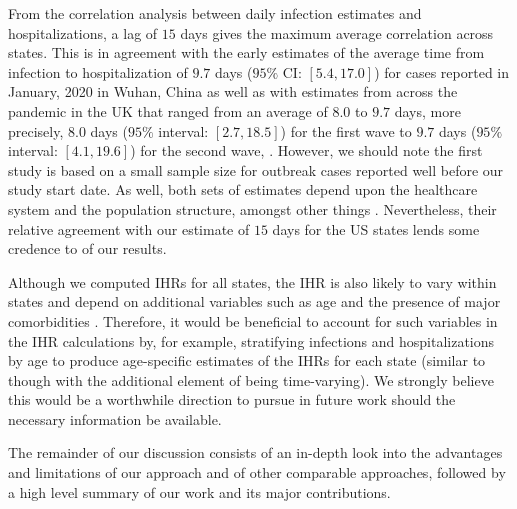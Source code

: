 \documentclass{article}
\begin{document}
From the correlation analysis between daily infection estimates and
hospitalizations, a lag of $15$ days gives the maximum average correlation
across states. This is in agreement with the early estimates of the average time from
 infection to hospitalization of $9.7$ days ($95\%$ CI: $[5.4, 17.0]$) for
cases reported in January, 2020 in Wuhan, China as well as with estimates from
across the pandemic in the UK that ranged from an average of $8.0$ to $9.7$
days, more precisely, $8.0$ days ($95\%$ interval: $[2.7, 18.5]$) for the first
wave to $9.7$ days ($95\%$ interval: $[4.1, 19.6]$) for the second wave,
\citep{ward2021understanding}. However, we should note the first study is based
on a small sample size for outbreak cases reported well before our study start
date. As well, both sets of estimates depend upon the healthcare system and the
population structure, amongst other things \citep{ward2021understanding}.
Nevertheless, their relative agreement with our estimate of $15$ days for the US
states lends some credence to of our results. 

Although we computed IHRs for all states, the IHR is also likely to vary within
states and depend on additional variables such as age and the presence of major
comorbidities \citep{russell2023comorbidities}. Therefore, it would be
beneficial to account for such variables in the IHR calculations by, for
example, stratifying infections and hospitalizations by age to produce
age-specific estimates of the IHRs for each state (similar to
\citealt{fox2023disproportionate} though with the additional element of being
time-varying). We strongly believe this would be a worthwhile direction to
pursue in future work should the necessary information be available. 

The remainder of our discussion consists of an in-depth look into the advantages and
limitations of our approach and of other comparable approaches, followed by a
high level summary of our work and its major contributions. 
\end{document}
